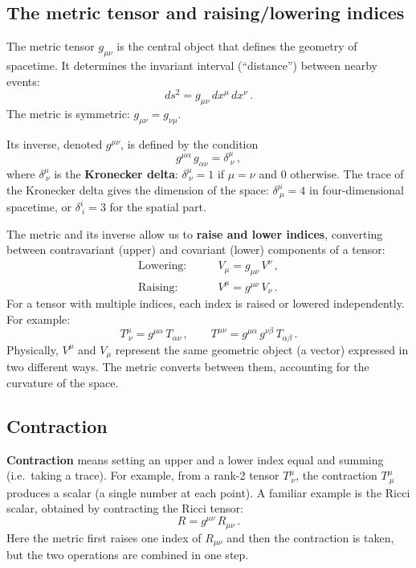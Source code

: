 \subsection*{The metric tensor and raising/lowering indices}

The metric tensor $g_{\mu\nu}$ is the central object that defines the geometry of spacetime. It determines the invariant interval (``distance'') between nearby events:
\begin{equation}
    ds^2 = g_{\mu\nu}\,dx^\mu\,dx^\nu\,.
\end{equation}
The metric is symmetric: $g_{\mu\nu}=g_{\nu\mu}$.

Its inverse, denoted $g^{\mu\nu}$, is defined by the condition
\begin{equation}
    g^{\mu\alpha}\,g_{\alpha\nu} = \delta^\mu_{\ \nu}\,,
\end{equation}
where $\delta^\mu_{\ \nu}$ is the \textbf{Kronecker delta}: $\delta^\mu_{\ \nu}=1$ if $\mu=\nu$ and $0$ otherwise. The trace of the Kronecker delta gives the dimension of the space: $\delta^\mu_{\ \mu}=4$ in four-dimensional spacetime, or $\delta^i_{\ i}=3$ for the spatial part.

The metric and its inverse allow us to \textbf{raise and lower indices}, converting between contravariant (upper) and covariant (lower) components of a tensor:
\begin{align}
    \text{Lowering:} &\qquad V_\mu = g_{\mu\nu}\,V^\nu\,,\\[4pt]
    \text{Raising:}  &\qquad V^\mu = g^{\mu\nu}\,V_\nu\,.
\end{align}
For a tensor with multiple indices, each index is raised or lowered independently. For example:
\begin{equation}
    T^{\mu}_{\ \nu} = g^{\mu\alpha}\,T_{\alpha\nu}\,,\qquad T^{\mu\nu} = g^{\mu\alpha}\,g^{\nu\beta}\,T_{\alpha\beta}\,.
\end{equation}
Physically, $V^\mu$ and $V_\mu$ represent the same geometric object (a vector) expressed in two different ways. The metric converts between them, accounting for the curvature of the space.

\subsection*{Contraction}

\textbf{Contraction} means setting an upper and a lower index equal and summing (i.e.\ taking a trace). For example, from a rank-2 tensor $T^{\mu}_{\ \nu}$, the contraction $T^\mu_{\ \mu}$ produces a scalar (a single number at each point). A familiar example is the Ricci scalar, obtained by contracting the Ricci tensor:
\begin{equation}
    R = g^{\mu\nu}\,R_{\mu\nu}\,.
\end{equation}
Here the metric first raises one index of $R_{\mu\nu}$ and then the contraction is taken, but the two operations are combined in one step.

